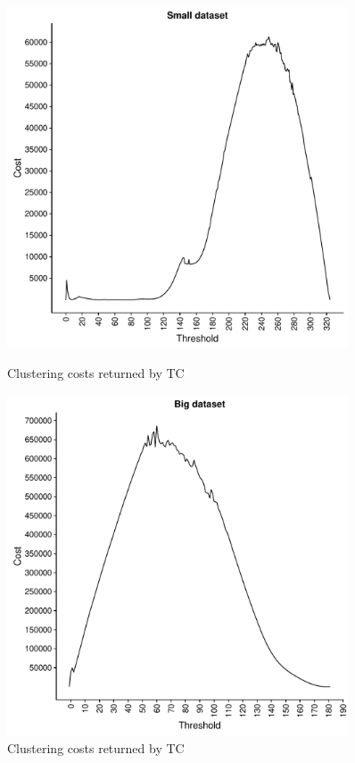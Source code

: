 \documentclass[a4paper,10pt]{article}
\theoremstyle{plain}
\theoremstyle{definition}
\begin{document}
\begin{figure}
	\centering
	\begin{minipage}{0.75\textwidth}
		\centering
		\includegraphics[width=0.9\textwidth]{./plots/plotCostSmallDataOriginal.pdf}
		\caption{Clustering costs returned by TC}
		\label{fig:measureSmallData}
	\end{minipage}
	\begin{minipage}{0.75\textwidth}
		\centering
		\includegraphics[width=0.9\textwidth]{./plots/plotCostBigDataOriginal.pdf}
		\caption{Clustering costs returned by TC}
		\label{fig:measureBigData}
	\end{minipage}
\end{figure}
\end{document}
